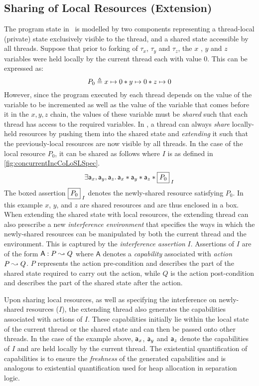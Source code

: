 \subsection{Sharing of Local Resources (Extension)}\label{subsec:extend}
The program state in \colosl\ is modelled by two components representing a thread-local (private) state exclusively visible to the thread, and a shared state accessible by all threads. Suppose that prior to forking of $\tau_x$, $\tau_y$ and $\tau_z$, the $x$ , $y$ and $z$ variables were held locally by the current thread each with value $0$. This can be expressed as:
%
\[
	P_{0} \mathrel{\triangleq} x \mapsto 0 * y \mapsto 0 * z \mapsto 0
\]
%
However, since the program executed by each thread depends on the value of the variable to be incremented as well as the value of the variable that comes before it in the $x, y, z$ chain, the values of these variable must be \emph{shared} such that each thread has access to the required variables. In \colosl, a thread can always \emph{share} locally-held resources by pushing them into the shared state and \emph{extending} it such that the previously-local resources are now visible by all threads. In the case of the local resource $P_0$, it can be shared as follows where $I$ is as defined in \fig\ref{fig:concurrentIncCoLoSLSpec}.
%
\[
	\exsts{\token a_x, \token a_y, \token a_z} \token a_x * \token a_y * \token a_z * \shared{P_0}{I}
\]
%
The boxed assertion $\shared{P_0}{I}$ denotes the newly-shared resource satisfying $P_0$. In this example $x$, $y$, and $z$ are shared resources and are thus enclosed in a box. 
When extending the shared state with local resources, the extending thread can also prescribe a new \emph{interference environment} that specifies the ways in which the newly-shared resources can be manipulated by both the current thread and the environment. This is captured by the \emph{interference assertion} $I$.
Assertions of $I$ are of the form $\textsf{A}: P \mathrel{\leadsto} Q$ where $\textsf{A}$ denotes a \emph{capability} associated with \emph{action} $P \mathrel{\leadsto} Q$. $P$ represents the action pre-condition and describes the part of the shared state required to carry out the action, while $Q$ is the action post-condition and describes the part of the shared state after the action. 

Upon sharing local resources, as well as specifying the interference on newly-shared resources ($I$), the extending thread also generates the capabilities associated with actions of $I$. These capabilities initially lie within the local state of the current thread or the shared state and can then be passed onto other threads. In the case of the example above, $\mathsf{a}_x$, $\mathsf{a}_y$ and $\mathsf{a}_z$ denote the capabilities of $I$ and are held locally by the current thread. The existential quantification of capabilities is to ensure the \emph{freshness} of the generated capabilities and is analogous to existential quantification used for heap allocation in separation logic. 

